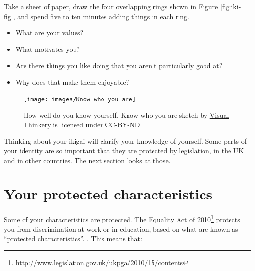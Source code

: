\documentclass[
]{book}
\providecommand{\tightlist}{%
  \setlength{\itemsep}{0pt}\setlength{\parskip}{0pt}}
\begin{document}
Take a sheet of paper, draw the four overlapping rings shown in Figure \ref{fig:iki-fig}, and spend five to ten minutes adding things in each ring.

\begin{itemize}
\tightlist
\item
  What are your values?
\item
  What motivates you?
\item
  Are there things you like doing that you aren't particularly good at?
\item
  Why does that make them enjoyable?
\end{itemize}

\begin{figure}

{\centering \texttt{[image: images/Know who you are]} 

}

\caption{How well do you know yourself. Know who you are sketch by \href{https://visualthinkery.com}{Visual Thinkery} is licensed under \href{https://creativecommons.org/licenses/by-nd/4.0/}{CC-BY-ND}}\label{fig:know-fig}
\end{figure}



Thinking about your ikigai will clarify your knowledge of yourself. Some parts of your identity are so important that they are protected by legislation, in the UK and in other countries. The next section looks at those.

\hypertarget{protected}{%
\section{Your protected characteristics}\label{protected}}

Some of your characteristics are protected. The Equality Act of 2010\footnote{\url{http://www.legislation.gov.uk/ukpga/2010/15/contents}} protects you from discrimination at work or in education, based on what are known as ``protected characteristics''. \citep{equality}. This means that:
\end{document}
